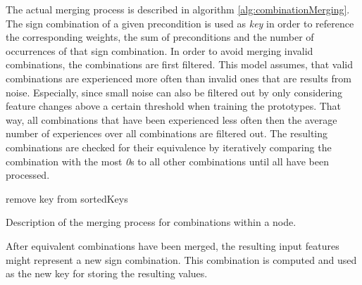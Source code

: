 The actual merging process is described in algorithm \ref{alg:combinationMerging}. The sign combination of a given precondition is used as \textit{key} in order to reference the corresponding weights, the sum of preconditions and the number of occurrences of that sign combination. 
In order to avoid merging invalid combinations, the combinations are first filtered. This model assumes, that valid combinations are experienced more often than invalid ones that are results from noise. 
Especially, since small noise can also be filtered out by only considering feature changes above a certain threshold when training the prototypes. That way, all combinations that have been experienced less often then the average number of experiences over all combinations are filtered out. 
The resulting combinations are checked for their equivalence by iteratively comparing the combination with the most \textit{0}s to all other combinations until all have been processed.

\begin{algorithm}[H]
\begin{algorithmic}[1]
	
	\Statex
				\State remove key from sortedKeys
			\EndIf
		\EndFor
	\EndWhile
\end{algorithmic}
\caption{Description of the merging process for combinations within a node.}
\label{alg:combinationMerging}
\end{algorithm}

After equivalent combinations have been merged, the resulting input features might represent a new sign combination. This combination is computed and used as the new key for storing the resulting values. 


